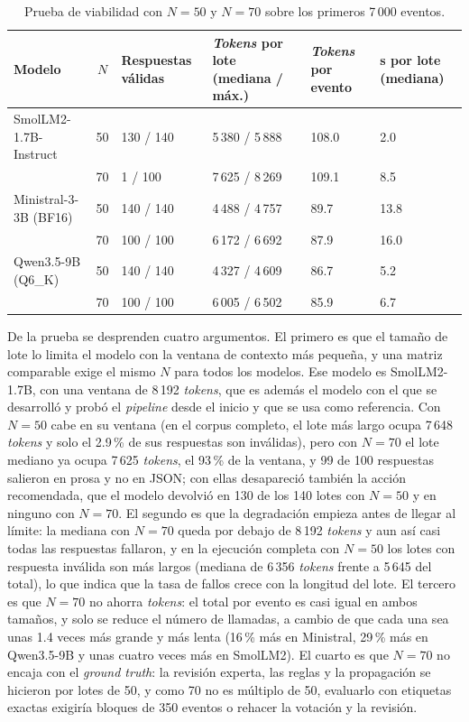\begin{table}[H]
\centering
\caption{Prueba de viabilidad con $N = 50$ y $N = 70$ sobre los primeros 7\,000 eventos.}
\label{tab:met_n70}
\small
\begin{tabular}{@{}p{3.3cm}cp{1.8cm}p{2.6cm}p{1.6cm}p{1.6cm}@{}}
\toprule
\textbf{Modelo} & $N$ & \textbf{Respuestas válidas} & \textbf{\textit{Tokens} por lote (mediana / máx.)} & \textbf{\textit{Tokens} por evento} & \textbf{s por lote (mediana)} \\
\midrule
SmolLM2-1.7B-Instruct & 50 & 130 / 140 & 5\,380 / 5\,888 & 108.0 & 2.0 \\
 & 70 & 1 / 100 & 7\,625 / 8\,269 & 109.1 & 8.5 \\
Ministral-3-3B (BF16) & 50 & 140 / 140 & 4\,488 / 4\,757 & 89.7 & 13.8 \\
 & 70 & 100 / 100 & 6\,172 / 6\,692 & 87.9 & 16.0 \\
Qwen3.5-9B (Q6\_K) & 50 & 140 / 140 & 4\,327 / 4\,609 & 86.7 & 5.2 \\
 & 70 & 100 / 100 & 6\,005 / 6\,502 & 85.9 & 6.7 \\
\bottomrule
\end{tabular}
\normalsize
\end{table}

De la prueba se desprenden cuatro argumentos. El primero es que el tamaño de lote lo limita el modelo con la ventana de contexto más pequeña, y una matriz comparable exige el mismo $N$ para todos los modelos. Ese modelo es SmolLM2-1.7B, con una ventana de 8\,192 \textit{tokens}, que es además el modelo con el que se desarrolló y probó el \textit{pipeline} desde el inicio y que se usa como referencia. Con $N = 50$ cabe en su ventana (en el corpus completo, el lote más largo ocupa 7\,648 \textit{tokens} y solo el 2.9\,\% de sus respuestas son inválidas), pero con $N = 70$ el lote mediano ya ocupa 7\,625 \textit{tokens}, el 93\,\% de la ventana, y 99 de 100 respuestas salieron en prosa y no en JSON; con ellas desapareció también la acción recomendada, que el modelo devolvió en 130 de los 140 lotes con $N = 50$ y en ninguno con $N = 70$. El segundo es que la degradación empieza antes de llegar al límite: la mediana con $N = 70$ queda por debajo de 8\,192 \textit{tokens} y aun así casi todas las respuestas fallaron, y en la ejecución completa con $N = 50$ los lotes con respuesta inválida son más largos (mediana de 6\,356 \textit{tokens} frente a 5\,645 del total), lo que indica que la tasa de fallos crece con la longitud del lote. El tercero es que $N = 70$ no ahorra \textit{tokens}: el total por evento es casi igual en ambos tamaños, y solo se reduce el número de llamadas, a cambio de que cada una sea unas 1.4 veces más grande y más lenta (16\,\% más en Ministral, 29\,\% más en Qwen3.5-9B y unas cuatro veces más en SmolLM2). El cuarto es que $N = 70$ no encaja con el \textit{ground truth}: la revisión experta, las reglas y la propagación se hicieron por lotes de 50, y como 70 no es múltiplo de 50, evaluarlo con etiquetas exactas exigiría bloques de 350 eventos o rehacer la votación y la revisión.

